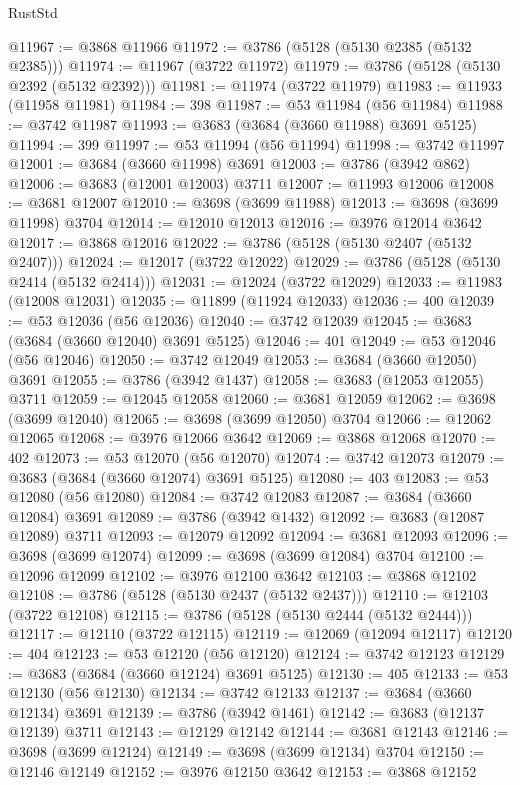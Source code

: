 \begin{lexlean}{RustStd}
\begin{coremodule}
{\begin{coremodule}
{{{{{{{{{{{{{{{{{{{{{{{{{{{{{{{{{{{{{{{{{{{{{{{@11967 := @3868 @11966
@11972 := @3786 (@5128 (@5130 @2385 (@5132 @2385)))
@11974 := @11967 (@3722 @11972)
@11979 := @3786 (@5128 (@5130 @2392 (@5132 @2392)))
@11981 := @11974 (@3722 @11979)
@11983 := @11933 (@11958 @11981)
@11984 := 398
@11987 := @53 @11984 (@56 @11984)
@11988 := @3742 @11987
@11993 := @3683 (@3684 (@3660 @11988) @3691 @5125)
@11994 := 399
@11997 := @53 @11994 (@56 @11994)
@11998 := @3742 @11997
@12001 := @3684 (@3660 @11998) @3691
@12003 := @3786 (@3942 @862)
@12006 := @3683 (@12001 @12003) @3711
@12007 := @11993 @12006
@12008 := @3681 @12007
@12010 := @3698 (@3699 @11988)
@12013 := @3698 (@3699 @11998) @3704
@12014 := @12010 @12013
@12016 := @3976 @12014 @3642
@12017 := @3868 @12016
@12022 := @3786 (@5128 (@5130 @2407 (@5132 @2407)))
@12024 := @12017 (@3722 @12022)
@12029 := @3786 (@5128 (@5130 @2414 (@5132 @2414)))
@12031 := @12024 (@3722 @12029)
@12033 := @11983 (@12008 @12031)
@12035 := @11899 (@11924 @12033)
@12036 := 400
@12039 := @53 @12036 (@56 @12036)
@12040 := @3742 @12039
@12045 := @3683 (@3684 (@3660 @12040) @3691 @5125)
@12046 := 401
@12049 := @53 @12046 (@56 @12046)
@12050 := @3742 @12049
@12053 := @3684 (@3660 @12050) @3691
@12055 := @3786 (@3942 @1437)
@12058 := @3683 (@12053 @12055) @3711
@12059 := @12045 @12058
@12060 := @3681 @12059
@12062 := @3698 (@3699 @12040)
@12065 := @3698 (@3699 @12050) @3704
@12066 := @12062 @12065
@12068 := @3976 @12066 @3642
@12069 := @3868 @12068
@12070 := 402
@12073 := @53 @12070 (@56 @12070)
@12074 := @3742 @12073
@12079 := @3683 (@3684 (@3660 @12074) @3691 @5125)
@12080 := 403
@12083 := @53 @12080 (@56 @12080)
@12084 := @3742 @12083
@12087 := @3684 (@3660 @12084) @3691
@12089 := @3786 (@3942 @1432)
@12092 := @3683 (@12087 @12089) @3711
@12093 := @12079 @12092
@12094 := @3681 @12093
@12096 := @3698 (@3699 @12074)
@12099 := @3698 (@3699 @12084) @3704
@12100 := @12096 @12099
@12102 := @3976 @12100 @3642
@12103 := @3868 @12102
@12108 := @3786 (@5128 (@5130 @2437 (@5132 @2437)))
@12110 := @12103 (@3722 @12108)
@12115 := @3786 (@5128 (@5130 @2444 (@5132 @2444)))
@12117 := @12110 (@3722 @12115)
@12119 := @12069 (@12094 @12117)
@12120 := 404
@12123 := @53 @12120 (@56 @12120)
@12124 := @3742 @12123
@12129 := @3683 (@3684 (@3660 @12124) @3691 @5125)
@12130 := 405
@12133 := @53 @12130 (@56 @12130)
@12134 := @3742 @12133
@12137 := @3684 (@3660 @12134) @3691
@12139 := @3786 (@3942 @1461)
@12142 := @3683 (@12137 @12139) @3711
@12143 := @12129 @12142
@12144 := @3681 @12143
@12146 := @3698 (@3699 @12124)
@12149 := @3698 (@3699 @12134) @3704
@12150 := @12146 @12149
@12152 := @3976 @12150 @3642
@12153 := @3868 @12152
}}}}}}}}}}}}}}}}}}}}}}}}}}}}}}}}}}}}}}}}}}}}}}}
\end{coremodule}}
\end{coremodule}
\end{lexlean}
